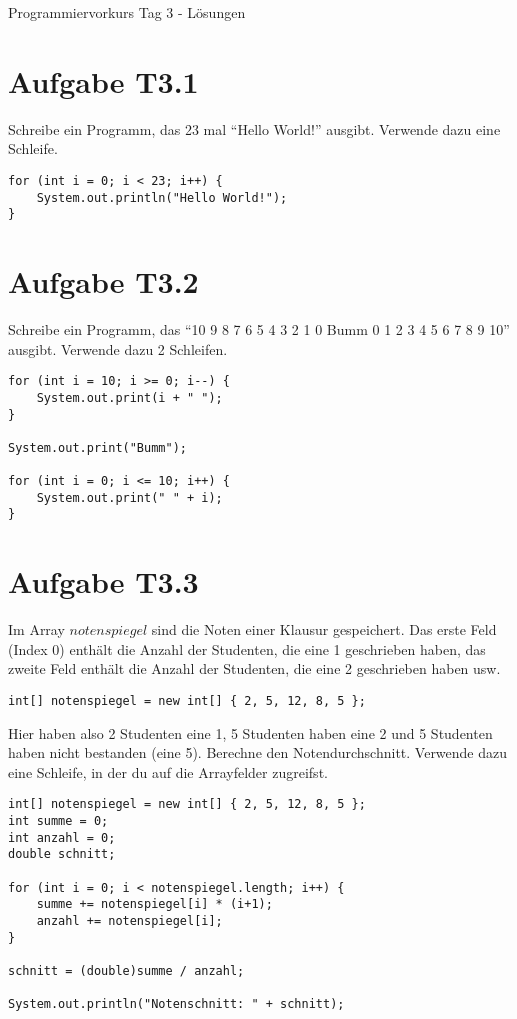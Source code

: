 \documentclass[final,a4paper]{article}
\begin{document}


{\huge Programmiervorkurs Tag 3 - Lösungen}

\bigskip

\section*{Aufgabe T3.1}
Schreibe ein Programm, das 23 mal "`Hello World!"' ausgibt. Verwende dazu eine Schleife.

\begin{lstlisting}
for (int i = 0; i < 23; i++) {
	System.out.println("Hello World!");
}
\end{lstlisting}

\section*{Aufgabe T3.2}
Schreibe ein Programm, das "`10 9 8 7 6 5 4 3 2 1 0 Bumm 0 1 2 3 4 5 6 7 8 9 10"' ausgibt.
Verwende dazu 2 Schleifen.

\begin{lstlisting}
for (int i = 10; i >= 0; i--) {
	System.out.print(i + " ");
}

System.out.print("Bumm");

for (int i = 0; i <= 10; i++) {
	System.out.print(" " + i);
}
\end{lstlisting}

\section*{Aufgabe T3.3}
Im Array $notenspiegel$ sind die Noten einer Klausur gespeichert. Das erste Feld (Index $0$)
enthält die Anzahl der Studenten, die eine 1 geschrieben haben, das zweite Feld enthält
die Anzahl der Studenten, die eine 2 geschrieben haben usw.
\begin{lstlisting}
int[] notenspiegel = new int[] { 2, 5, 12, 8, 5 };
\end{lstlisting}
Hier haben also 2 Studenten eine 1, 5 Studenten haben eine 2 und 5 Studenten haben nicht bestanden (eine 5).
Berechne den Notendurchschnitt. Verwende dazu eine Schleife, in der du auf die
Arrayfelder zugreifst.

\begin{lstlisting}
int[] notenspiegel = new int[] { 2, 5, 12, 8, 5 };
int summe = 0;
int anzahl = 0;
double schnitt;

for (int i = 0; i < notenspiegel.length; i++) {
	summe += notenspiegel[i] * (i+1);
	anzahl += notenspiegel[i];
}

schnitt = (double)summe / anzahl;

System.out.println("Notenschnitt: " + schnitt);
\end{lstlisting}
\end{document}

